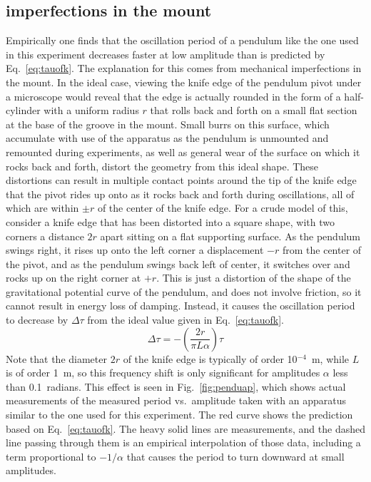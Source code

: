 \documentclass{revtex4}
\begin{document}
\subsection{imperfections in the mount}

Empirically one finds that the oscillation period of a pendulum like the
one used in this experiment decreases faster at low amplitude than is
predicted by Eq.~\ref{eq:tauofk}.  The explanation for this comes from
mechanical imperfections in the mount.  In the ideal case, viewing the
knife edge of the pendulum pivot under a microscope would reveal that the
edge is actually rounded in the form of a half-cylinder with a uniform
radius $r$ that rolls back and forth on a small flat section at the base
of the groove in the mount.  Small burrs on this surface, which accumulate
with use of the apparatus as the pendulum is unmounted and remounted during
experiments, as well as general wear of the surface on which it rocks back
and forth, distort the geometry from this ideal shape.  These distortions
can result in multiple contact points around the tip of the knife edge
that the pivot rides up onto as it rocks back and forth during oscillations,
all of which are within $\pm r$ of the center of the knife edge.  For a
crude model of this, consider a knife edge that has been distorted into
a square shape, with two corners a distance $2r$ apart sitting on a flat
supporting surface.  As the pendulum swings right, it rises up onto the
left corner a displacement $-r$ from the center of the pivot, and as the
pendulum swings back left of center, it switches over and rocks up on the
right corner at $+r$.  This is just a distortion of
the shape of the gravitational potential curve of the pendulum, and does
not involve friction, so it cannot result in energy loss of damping.
Instead, it causes the oscillation period to decrease by $\Delta\tau$ from
the ideal value given in Eq.~\ref{eq:tauofk}.
\begin{equation}
\Delta\tau = -\left(\frac{2r}{\pi L\alpha}\right) \tau
\label{eq:deltatau}
\end{equation}
Note that the diameter $2r$ of the knife edge is typically of order
10$^{-4}$~m, while $L$ is of order 1~m, so this frequency shift is only
significant for amplitudes $\alpha$ less than 0.1~radians.  This effect
is seen in Fig.~\ref{fig:penduap}, which shows actual measurements of the
measured period vs.\ amplitude taken with an apparatus
similar to the one used for this experiment.  The red curve shows the
prediction based on Eq.~\ref{eq:tauofk}.  The heavy solid lines are
measurements, and the dashed line passing through them is an empirical
interpolation of those data, including a term proportional to $-1/\alpha$
that causes the period to turn downward at small amplitudes.
\end{document}
